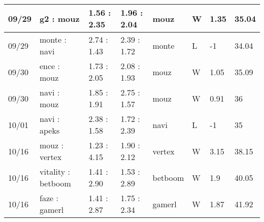 \begin{small}
\begin{longtable}{|l|l|l|l|l|l|l|l|}
	09/29                               & g2 : mouz                           & 1.56 : 2.35                             & 1.96 : 2.04                             & mouz                              & W                                 & 1.35                                 & 35.04                             \\ \hline
	09/29                               & monte : navi                        & 2.74 : 1.43                             & 2.39 : 1.72                             & monte                             & L                                 & -1                                   & 34.04                             \\ \hline
	09/30                               & ence : mouz                         & 1.73 : 2.05                             & 2.08 : 1.93                             & mouz                              & W                                 & 1.05                                 & 35.09                             \\ \hline
	09/30                               & navi : mouz                         & 1.85 : 1.91                             & 2.75 : 1.57                             & mouz                              & W                                 & 0.91                                 & 36                                \\ \hline
	10/01                               & navi : apeks                        & 2.38 : 1.58                             & 1.72 : 2.39                             & navi                              & L                                 & -1                                   & 35                                \\ \hline
	10/16                               & mouz : vertex                       & 1.23 : 4.15                             & 1.90 : 2.12                             & vertex                            & W                                 & 3.15                                 & 38.15                             \\ \hline
	10/16                               & vitality : betboom                  & 1.41 : 2.90                             & 1.53 : 2.89                             & betboom                           & W                                 & 1.9                                  & 40.05                             \\ \hline
	10/16                               & faze : gamerl                       & 1.41 : 2.87                             & 1.75 : 2.34                             & gamerl                            & W                                 & 1.87                                 & 41.92                             \\ \hline

\end{longtable}
\end{small}
